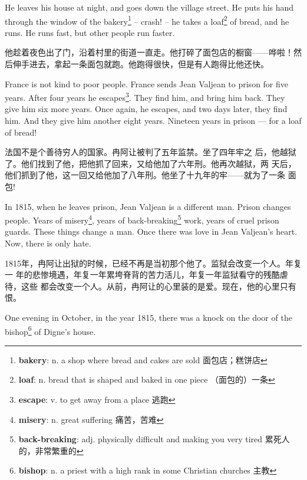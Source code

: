\documentclass[fontset=ubuntu, zihao=5]{ctexart}
\begin{document}
\begin{paracol}{2}
  \switchcolumn

  He leaves his house at night, and goes down the village street. He puts his hand through the window of the bakery\footnote{\textbf{bakery}: n. a shop where bread and cakes are sold 面包店；糕饼店} – crash! – he takes a loaf\footnote{\textbf{loaf}: n. bread that is shaped and baked in one piece （面包的）一条} of bread, and he runs. He runs fast, but other people run faster.

  \switchcolumn

  他趁着夜色出了门，沿着村里的街道一直走。他打碎了面包店的橱窗——哗啦！然后伸手进去，拿起一条面包就跑。他跑得很快，但是有人跑得比他还快。

  \switchcolumn*

  France is not kind to poor people. France sends Jean Valjean to prison for five years. After four years he escapes\footnote{\textbf{escape}: v. to get away from a place 逃跑}. They find him, and bring him back. They give him six more years. Once again, he escapes, and two days later, they find him. And they give him another eight years. Nineteen years in prison --- for a loaf of bread!

  \switchcolumn

  法国不是个善待穷人的国家。冉阿让被判了五年监禁。坐了四年牢之
  后，他越狱了。他们找到了他，把他抓了回来，又给他加了六年刑。他再次越狱，两
  天后，他们抓到了他，这一回又给他加了八年刑。他坐了十九年的牢——就为了一条
  面包!

  \switchcolumn*

  In 1815, when he leaves prison, Jean Valjean is a different man.
  Prison changes people. Years of misery\footnote{\textbf{misery}: n. great suffering 痛苦，苦难}, years of back-breaking\footnote{\textbf{back-breaking}: adj. physically difficult and making you very tired 累死人的，非常繁重的} work, years
  of cruel prison guards. These things change a man. Once there was love in
  Jean Valjean's heart. Now, there is only hate.

  \switchcolumn

  1815年，冉阿让出狱的时候，已经不再是当初那个他了。监狱会改变一个人。年复一
  年的悲惨境遇，年复一年累垮脊背的苦力活儿，年复一年监狱看守的残酷虐待，这些
  都会改变一个人。从前，冉阿让的心里装的是爱。现在，他的心里只有
  恨。

  \switchcolumn*

  \sectionbreak

  One evening in October, in the year 1815, there was a knock on the door of
  the bishop\footnote{\textbf{bishop}: n. a priest with a high rank in some Christian churches 主教} of Digne's house.


\end{paracol}
\end{document}
